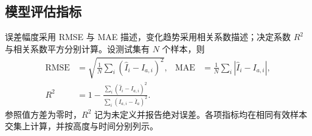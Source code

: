 \subsection{模型评估指标}
误差幅度采用 RMSE 与 MAE 描述，变化趋势采用相关系数描述；决定系数 $R^2$ 与相关系数平方分别计算。设测试集有 $N$ 个样本，则
\begin{align}
\mathrm{RMSE}&=\sqrt{\frac1N\sum_i(\widehat I_i-I_{a,i})^2},&
\mathrm{MAE}&=\frac1N\sum_i|\widehat I_i-I_{a,i}|,\\
R^2&=1-\frac{\sum_i(\widehat I_i-I_{a,i})^2}{\sum_i(I_{a,i}-\overline I_a)^2}.
\end{align}
参照值方差为零时，$R^2$ 记为未定义并报告绝对误差。各项指标均在相同有效样本交集上计算，并按高度与时间分别列示。
